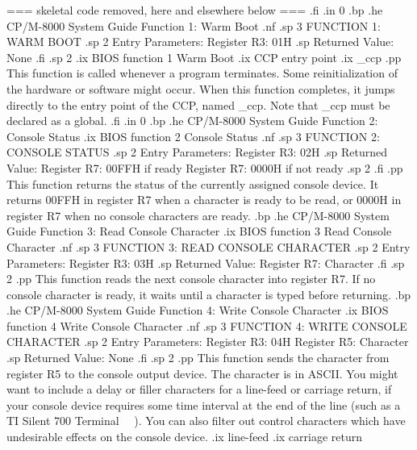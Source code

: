 	=== skeletal code removed, here and elsewhere below ===
.fi
.in 0
.bp
.he CP/M-8000 System Guide                      Function 1:  Warm Boot
.nf
.sp 3
                     FUNCTION 1:  WARM BOOT
.sp 2
                     Entry Parameters:
                        Register R3:  01H
.sp
                     Returned   Value:  None
.fi
.sp 2
.ix BIOS function 1 Warm Boot
.ix CCP entry point
.ix _ccp
.pp
This function is called whenever a program terminates.  Some reinitialization
of the hardware or software might occur.  When this function completes, it 
jumps
directly to the entry point of the CCP, named _ccp.  Note that _ccp
must be declared as a global. 
.fi
.in 0
.bp
.he CP/M-8000 System Guide                 Function 2:  Console Status
.ix BIOS function 2 Console Status
.nf
.sp 3
                   FUNCTION 2:  CONSOLE STATUS
.sp 2
              Entry Parameters:
                 Register R3: 02H	   
.sp
              Returned   Value:
                 Register R7: 00FFH if ready
                 Register R7: 0000H if not ready
.sp 2
.fi
.pp
This function returns the status of the currently assigned console device.
It returns 00FFH in register R7 when a character is ready to be read, or 
0000H in register R7 when no console characters are ready.
.bp
.he CP/M-8000 System Guide         Function 3:  Read Console Character
.ix BIOS function 3 Read Console Character
.nf
.sp 3
               FUNCTION 3:  READ CONSOLE CHARACTER
.sp 2 
                   Entry Parameters:
                      Register R3:  03H
.sp
                   Returned   Value:
                      Register R7: Character
.fi
.sp 2
.pp
This function reads the next console character into register R7.  If no 
console character is ready, it waits until a character is typed before
returning.
.bp
.he CP/M-8000 System Guide        Function 4:  Write Console Character
.ix BIOS function 4 Write Console Character
.nf
.sp 3
              FUNCTION 4:  WRITE CONSOLE CHARACTER
.sp 2 
                   Entry Parameters:
                      Register R3: 04H
                      Register R5: Character
.sp
                   Returned   Value: None
.fi
.sp 2
.pp
This function sends the character from register R5 to the console output 
device.  The character is in ASCII.  You might want to include a delay or 
filler 
characters for a line-feed or carriage return, if your console device 
requires some time interval at  the end  of the  line  (such as  a TI Silent 
700 
Terminal \ \ ).  You can also filter out control characters which have 
undesirable 
effects on the console device. 
.ix line-feed
.ix carriage return
